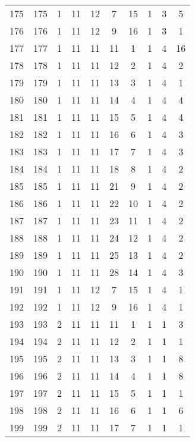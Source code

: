 \begin{longtable}{cccccccccc}
  175 & 175 &   1 &  11 &  12 &   7 &  15 &   1 &   3 &   5 \\ 
  176 & 176 &   1 &  11 &  12 &   9 &  16 &   1 &   3 &   1 \\ 
  177 & 177 &   1 &  11 &  11 &  11 &   1 &   1 &   4 &  16 \\ 
  178 & 178 &   1 &  11 &  11 &  12 &   2 &   1 &   4 &   2 \\ 
  179 & 179 &   1 &  11 &  11 &  13 &   3 &   1 &   4 &   1 \\ 
  180 & 180 &   1 &  11 &  11 &  14 &   4 &   1 &   4 &   4 \\ 
  181 & 181 &   1 &  11 &  11 &  15 &   5 &   1 &   4 &   4 \\ 
  182 & 182 &   1 &  11 &  11 &  16 &   6 &   1 &   4 &   3 \\ 
  183 & 183 &   1 &  11 &  11 &  17 &   7 &   1 &   4 &   3 \\ 
  184 & 184 &   1 &  11 &  11 &  18 &   8 &   1 &   4 &   2 \\ 
  185 & 185 &   1 &  11 &  11 &  21 &   9 &   1 &   4 &   2 \\ 
  186 & 186 &   1 &  11 &  11 &  22 &  10 &   1 &   4 &   2 \\ 
  187 & 187 &   1 &  11 &  11 &  23 &  11 &   1 &   4 &   2 \\ 
  188 & 188 &   1 &  11 &  11 &  24 &  12 &   1 &   4 &   2 \\ 
  189 & 189 &   1 &  11 &  11 &  25 &  13 &   1 &   4 &   2 \\ 
  190 & 190 &   1 &  11 &  11 &  28 &  14 &   1 &   4 &   3 \\ 
  191 & 191 &   1 &  11 &  12 &   7 &  15 &   1 &   4 &   1 \\ 
  192 & 192 &   1 &  11 &  12 &   9 &  16 &   1 &   4 &   1 \\ 
  193 & 193 &   2 &  11 &  11 &  11 &   1 &   1 &   1 &   3 \\ 
  194 & 194 &   2 &  11 &  11 &  12 &   2 &   1 &   1 &   1 \\ 
  195 & 195 &   2 &  11 &  11 &  13 &   3 &   1 &   1 &   8 \\ 
  196 & 196 &   2 &  11 &  11 &  14 &   4 &   1 &   1 &   8 \\ 
  197 & 197 &   2 &  11 &  11 &  15 &   5 &   1 &   1 &   1 \\ 
  198 & 198 &   2 &  11 &  11 &  16 &   6 &   1 &   1 &   6 \\ 
  199 & 199 &   2 &  11 &  11 &  17 &   7 &   1 &   1 &   1 \\ 

\end{longtable}
